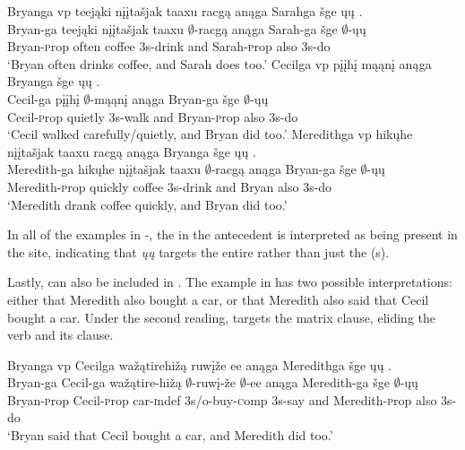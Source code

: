 \documentclass[output=paper]{LSP/langsci}
\begin{document}
\ea\label{ex:johnson:10}
\ea 
\glll Bryanga  {\ob}{vp} teejąki {nįįtašjak taaxu} racgą{\cb} anąga Sarahga šge {\ob}ųų{\cb} .\\ 
Bryan-ga {} teejąki {nįįtašjak taaxu} $\emptyset$-racgą anąga Sarah-ga šge $\emptyset$-ųų\\
Bryan-{\textsc prop} {} often coffee {\textsc 3s}-drink and Sarah-{\textsc prop} also {\textsc 3s}-do\\
\trans `Bryan often drinks coffee, and Sarah does too.'
\ex 
\glll Cecilga  {\ob}{vp} pįįhį mąąnį{\cb} anąga Bryanga šge {\ob}ųų{\cb} .\\
Cecil-ga {} pįįhį $\emptyset$-mąąnį anąga Bryan-ga šge $\emptyset$-ųų\\
Cecil-{\textsc prop} {} quietly {\textsc 3s}-walk and Bryan-{\textsc prop} also {\textsc 3s}-do\\
\trans `Cecil walked carefully/quietly, and Bryan did too.'
\ex 
\glll Meredithga {\ob}{vp} hikųhe {nįįtašjak taaxu} racgą{\cb} anąga Bryanga šge {\ob}ųų{\cb} .\\
Meredith-ga {} hikųhe {nįįtašjak taaxu} $\emptyset$-racgą anąga Bryan-ga šge $\emptyset$-ųų\\
Meredith-{\textsc prop} {} quickly coffee {\textsc 3s}-drink and Bryan also {\textsc 3s}-do\\
\trans `Meredith drank coffee quickly, and Bryan did too.'
\z
\z

In all of the examples in -, the  in the antecedent  is interpreted as being present in the  site, indicating that \emph{ųų} targets the entire  rather than just the (s).

Lastly,   can also be included in . The example in  has two possible interpretations: either that Meredith also bought a car, or that Meredith also said that Cecil bought a car. Under the second reading,  targets the matrix clause, eliding the verb and its  clause.
 
\ea\label{ex:johnson:11} 
\glll Bryanga {\ob}{vp} Cecilga wažątirehižą ruwįže ee{\cb} anąga Meredithga šge {\ob}ųų{\cb} .\\
Bryan-ga {} Cecil-ga wažątire-hižą $\emptyset$-ruwį-že $\emptyset$-ee anąga Meredith-ga šge $\emptyset$-ųų\\
Bryan-{\textsc prop} {} Cecil-{\textsc prop} car-{\textsc indef} {\textsc 3s/o}-buy-{\textsc comp} {\textsc 3s}-say and Meredith-{\textsc prop} also {\textsc 3s}-do\\
\trans `Bryan said that Cecil bought a car, and Meredith did too.'
\z
\end{document}
